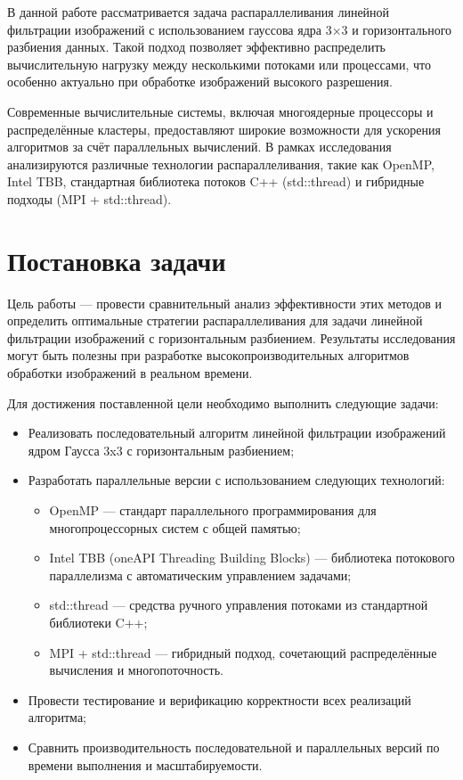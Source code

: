 \documentclass[12pt]{article}
\begin{document}
В данной работе рассматривается задача распараллеливания линейной фильтрации изображений с использованием гауссова ядра 3×3 и горизонтального разбиения данных. Такой подход позволяет эффективно распределить вычислительную нагрузку между несколькими потоками или процессами, что особенно актуально при обработке изображений высокого разрешения.

Современные вычислительные системы, включая многоядерные процессоры и распределённые кластеры, предоставляют широкие возможности для ускорения алгоритмов за счёт параллельных вычислений. В рамках исследования анализируются различные технологии распараллеливания, такие как OpenMP, Intel TBB, стандартная библиотека потоков C++ (std::thread) и гибридные подходы (MPI + std::thread).

\section{Постановка задачи}

\hspace*{1.25em}Цель работы — провести сравнительный анализ эффективности этих методов и определить оптимальные стратегии распараллеливания для задачи линейной фильтрации изображений с горизонтальным разбиением. Результаты исследования могут быть полезны при разработке высокопроизводительных алгоритмов обработки изображений в реальном времени.

Для достижения поставленной цели необходимо выполнить следующие задачи:

\begin{itemize}
\item Реализовать последовательный алгоритм линейной фильтрации изображений ядром Гаусса 3x3 с горизонтальным разбиением;
\item Разработать параллельные версии с использованием следующих технологий:
\begin{itemize}
\item OpenMP — стандарт параллельного программирования для многопроцессорных систем с общей памятью;
\item Intel TBB (oneAPI Threading Building Blocks) — библиотека потокового параллелизма с автоматическим управлением задачами;
\item std::thread — средства ручного управления потоками из стандартной библиотеки C++;
\item MPI + std::thread — гибридный подход, сочетающий распределённые вычисления и многопоточность.
\end{itemize}
\item Провести тестирование и верификацию корректности всех реализаций алгоритма;
\item Сравнить производительность последовательной и параллельных версий по времени выполнения и масштабируемости.
\end{itemize}
\end{document}
